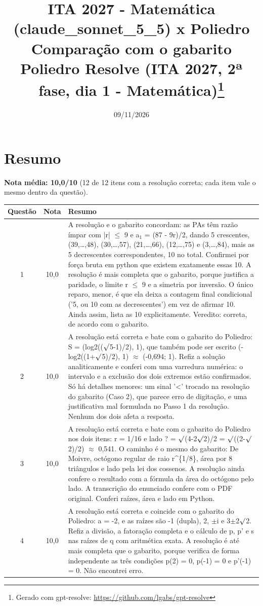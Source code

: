 \documentclass{article}%
\title{ITA 2027 {-} Matemática (claude\_sonnet\_5\_5) x Poliedro\\[4pt]\large Comparação com o gabarito Poliedro Resolve (ITA 2027, 2ª fase, dia 1 {-} Matemática)\thanks{Gerado com gpt-resolve: \url{https://github.com/lgabs/gpt-resolve}}}%
\date{09/11/2026}%
\begin{document}
%
\normalsize%
\maketitle%
\section*{Resumo}\textbf{Nota média: 10,0/10} (12 de 12 itens com a resolução correta; cada item vale o mesmo dentro da questão).\par\medskip%
\begin{longtable}{@{}c c p{}@{}}\toprule Questão & Nota & Resumo \\ \midrule
1 & 10,0 & A resolução e o gabarito concordam: as PAs têm razão ímpar com |r| $\leq$ 9 e a$_{1}$ = (87 - 9r)/2, dando 5 crescentes, (39,\ldots{},48), (30,\ldots{},57), (21,\ldots{},66), (12,\ldots{},75) e (3,\ldots{},84), mais as 5 decrescentes correspondentes, 10 no total. Confirmei por força bruta em python que existem exatamente essas 10. A resolução é mais completa que o gabarito, porque justifica a paridade, o limite r $\leq$ 9 e a simetria por inversão. O único reparo, menor, é que ela deixa a contagem final condicional ('5, ou 10 com as decrescentes') em vez de afirmar 10. Ainda assim, lista as 10 explicitamente. Veredito: correta, de acordo com o gabarito. \\
2 & 10,0 & A resolução está correta e bate com o gabarito do Poliedro: S = (log2(($\surd$5-1)/2), 1), que também pode ser escrito (-log2((1+$\surd$5)/2), 1) $\approx$ (-0,694; 1). Refiz a solução analiticamente e conferi com uma varredura numérica: o intervalo e a exclusão dos dois extremos estão confirmados. Só há detalhes menores: um sinal '<' trocado na resolução do gabarito (Caso 2), que parece erro de digitação, e uma justificativa mal formulada no Passo 1 da resolução. Nenhum dos dois afeta a resposta. \\
3 & 10,0 & A resolução está correta e bate com o gabarito do Poliedro nos dois itens: r = 1/16 e lado ? = $\surd$(4-2$\surd$2)/2 = $\surd$((2-$\surd$2)/2) $\approx$ 0,541. O caminho é o mesmo do gabarito: De Moivre, octógono regular de raio r\^{}\{1/8\}, área por 8 triângulos e lado pela lei dos cossenos. A resolução ainda confere o resultado com a fórmula da área do octógono pelo lado. A transcrição do enunciado confere com o PDF original. Conferi raízes, área e lado em Python. \\
4 & 10,0 & A resolução está correta e coincide com o gabarito do Poliedro: a = {-}2, e as raízes são {-}1 (dupla), 2, $\pm$i e 3$\pm$2$\surd$2. Refiz a divisão, a fatoração completa e o cálculo de p, p' e s nas raízes de q com aritmética exata. A resolução é até mais completa que o gabarito, porque verifica de forma independente as três condições p(2) = 0, p({-}1) = 0 e p'({-}1) = 0. Não encontrei erro. \\

\end{longtable}
\end{document}
